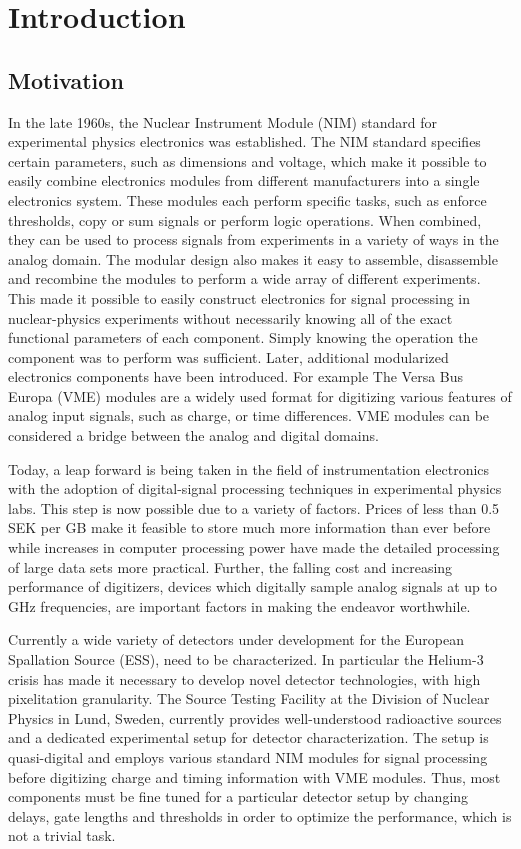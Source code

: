 \documentclass[main.tex]{subfiles}
\begin{document}
\chapter{Introduction}\label{ch:1}
\section{Motivation}
In the late 1960s, the Nuclear Instrument Module (NIM) standard for experimental physics electronics was established. The NIM standard specifies certain parameters, such as dimensions and voltage, which make it possible to easily combine electronics modules from different manufacturers into a single electronics system. These modules each perform specific tasks, such as enforce thresholds, copy or sum signals or perform logic operations. When combined, they can be used to process signals from experiments in a variety of ways in the analog domain. The modular design also makes it easy to assemble, disassemble and recombine the modules to perform a wide array of different experiments. 
This made it possible to easily construct electronics for signal processing in nuclear-physics experiments without necessarily knowing all of the exact functional parameters of each component. Simply knowing the operation the component was to perform was sufficient. Later, additional modularized electronics components have been introduced. For example The Versa Bus Europa (VME) modules are a widely used format for digitizing various features of analog input signals, such as charge, or time differences. VME modules can be considered a bridge between the analog and digital domains.

Today, a leap forward is being taken in the field of instrumentation electronics with the adoption of digital-signal processing techniques in experimental physics labs. This step is now possible due to a variety of factors. Prices of less than 0.5 SEK per GB make it feasible to store much more information than ever before while increases in computer processing power have made the detailed processing of large data sets more practical. Further, the falling cost and increasing performance of digitizers, devices which digitally sample analog signals at up to GHz frequencies, are important factors in making the endeavor worthwhile.

Currently a wide variety of detectors under development for the European Spallation Source (ESS), need to be characterized. In particular the Helium-3 crisis has made it necessary to develop novel detector technologies, with high pixelitation granularity. The Source Testing Facility at the Division of Nuclear Physics in Lund, Sweden, currently provides well-understood radioactive sources and a dedicated experimental setup for detector characterization. The setup is quasi-digital and employs various standard NIM modules for signal processing before digitizing charge and timing information with VME modules. Thus, most components must be fine tuned for a particular detector setup by changing delays, gate lengths and thresholds in order to optimize the performance, which is not a trivial task. 
\end{document}

